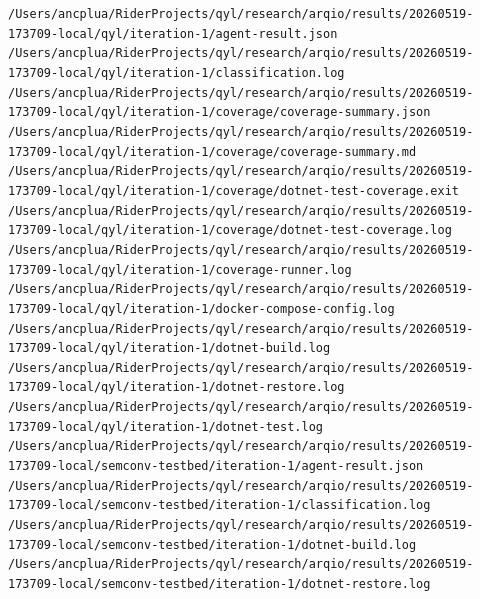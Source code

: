 \noindent \texttt{/Users/ancplua/RiderProjects/qyl/research/arqio/results/20260519-173709-local/qyl/iteration-1/agent-result.json}\\
\noindent \texttt{/Users/ancplua/RiderProjects/qyl/research/arqio/results/20260519-173709-local/qyl/iteration-1/classification.log}\\
\noindent \texttt{/Users/ancplua/RiderProjects/qyl/research/arqio/results/20260519-173709-local/qyl/iteration-1/coverage/coverage-summary.json}\\
\noindent \texttt{/Users/ancplua/RiderProjects/qyl/research/arqio/results/20260519-173709-local/qyl/iteration-1/coverage/coverage-summary.md}\\
\noindent \texttt{/Users/ancplua/RiderProjects/qyl/research/arqio/results/20260519-173709-local/qyl/iteration-1/coverage/dotnet-test-coverage.exit}\\
\noindent \texttt{/Users/ancplua/RiderProjects/qyl/research/arqio/results/20260519-173709-local/qyl/iteration-1/coverage/dotnet-test-coverage.log}\\
\noindent \texttt{/Users/ancplua/RiderProjects/qyl/research/arqio/results/20260519-173709-local/qyl/iteration-1/coverage-runner.log}\\
\noindent \texttt{/Users/ancplua/RiderProjects/qyl/research/arqio/results/20260519-173709-local/qyl/iteration-1/docker-compose-config.log}\\
\noindent \texttt{/Users/ancplua/RiderProjects/qyl/research/arqio/results/20260519-173709-local/qyl/iteration-1/dotnet-build.log}\\
\noindent \texttt{/Users/ancplua/RiderProjects/qyl/research/arqio/results/20260519-173709-local/qyl/iteration-1/dotnet-restore.log}\\
\noindent \texttt{/Users/ancplua/RiderProjects/qyl/research/arqio/results/20260519-173709-local/qyl/iteration-1/dotnet-test.log}\\
\noindent \texttt{/Users/ancplua/RiderProjects/qyl/research/arqio/results/20260519-173709-local/semconv-testbed/iteration-1/agent-result.json}\\
\noindent \texttt{/Users/ancplua/RiderProjects/qyl/research/arqio/results/20260519-173709-local/semconv-testbed/iteration-1/classification.log}\\
\noindent \texttt{/Users/ancplua/RiderProjects/qyl/research/arqio/results/20260519-173709-local/semconv-testbed/iteration-1/dotnet-build.log}\\
\noindent \texttt{/Users/ancplua/RiderProjects/qyl/research/arqio/results/20260519-173709-local/semconv-testbed/iteration-1/dotnet-restore.log}\\
